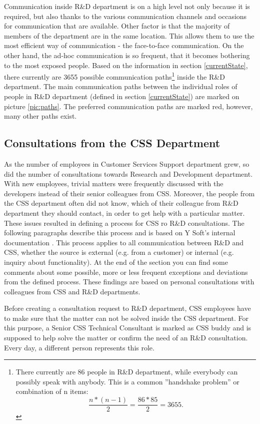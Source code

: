\documentclass[11pt,singleside]{myfithesis2}
\begin{document}
Communication inside R\&D department is on a high level not only because it is required, but also thanks to the various communication channels and occasions for communication that are available. Other factor is that the majority of members of the department are in the same location. This allows them to use the most efficient way of communication - the face-to-face communication. On the other hand, the ad-hoc communication is so frequent, that it becomes bothering to the most exposed people. Based on the information in section \ref{currentState}, there currently are 3655 possible communication paths\footnote{There currently are 86 people in R\&D department, while everybody can possibly speak with anybody. This is a common ''handshake problem'' or combination of n items:
\begin{equation}
	\frac{n*(n-1)}{2}=\frac{86*85}{2}=3655.
\end{equation} } inside the R\&D department. The main communication paths between the individual roles of people in R\&D department (defined in section \ref{currentState}) are marked on picture \ref{pic:paths}. The preferred communication paths are marked red, however, many other paths exist.

			
		\subsection{Consultations from the CSS Department}\label{cssConsult}
As the number of employees in Customer Services Support department grew, so did the number of consultations towards Research and Development department. With new employees, trivial matters were frequently discussed with the developers instead of their senior colleagues from CSS. Moreover, the people from the CSS department often did not know, which of their colleague from R\&D department they should contact, in order to get help with a particular matter. These issues resulted in defining a process for CSS ro R\&D consultations. The following paragraphs describe this process and is based on Y Soft's internal documentation \cite{ysoftInternal}. This process applies to all communication between R\&D and CSS, whether the source is external (e.g. from a customer) or internal (e.g. inquiry about functionality). At the end of the section you can find some comments about some possible, more or less frequent exceptions and deviations from the defined process. These findings are based on personal consultations with colleagues from CSS and R\&D departments.

Before creating a consultation request to R\&D department, CSS employees have to make sure that the matter can not be solved inside the CSS department. For this purpose, a Senior CSS Technical Consultant is marked as CSS buddy and is supposed to help solve the matter or confirm the need of an R\&D consultation. Every day, a different person represents this role.
\end{document}
